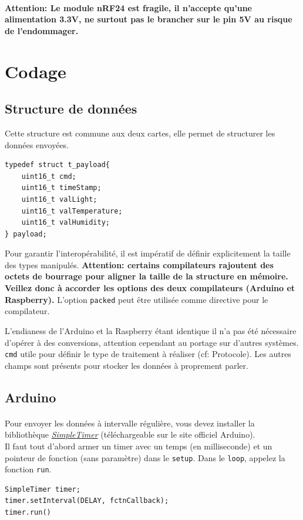 \documentclass[a4paper, titlepage, oneside, 12pt]{article}%
\begin{document}
\paragraph{}
\textbf{Attention: Le module nRF24 est fragile, il n'accepte qu'une alimentation 3.3V, ne surtout pas le brancher sur le pin 5V au risque de l'endommager.}

\section{Codage}
\subsection{Structure de données}
Cette structure est commune aux deux cartes, elle permet de structurer les données envoyées.
\begin{lstlisting}
typedef struct t_payload{
	uint16_t cmd;
	uint16_t timeStamp;
	uint16_t valLight;
	uint16_t valTemperature;
	uint16_t valHumidity;
} payload;
\end{lstlisting}
Pour garantir l’interopérabilité, il est impératif de définir explicitement la taille des types manipulés.
\textbf{Attention: certains compilateurs rajoutent des octets de bourrage pour aligner la taille de la structure en mémoire. Veillez donc à accorder les options des deux compilateurs (Arduino et Raspberry).}
L'option \texttt{packed} peut être utilisée comme directive pour le compilateur.
  
L'endianess de l'Arduino et la Raspberry étant identique il n'a pas été nécessaire d'opérer à des conversions, attention cependant au portage sur d'autres systèmes.
\texttt{cmd} utile pour définir le type de traitement à réaliser (cf: Protocole).
Les autres champs sont présents pour stocker les données à proprement parler.
\subsection{Arduino}
\paragraph{}
Pour envoyer les données à intervalle régulière, vous devez installer la bibliothèque \href{http://playground.arduino.cc/Code/SimpleTimer?ref=driverlayer.com/web}{\textit{SimpleTimer}} (téléchargeable sur le site officiel Arduino).\\
Il faut tout d'abord armer un timer avec un temps (en milliseconde) et un pointeur de fonction (sans paramètre) dans le \texttt{setup}. Dans le \texttt{loop}, appelez la fonction \texttt{run}.\\
\begin{lstlisting}
SimpleTimer timer;
timer.setInterval(DELAY, fctnCallback);
timer.run()
\end{lstlisting}
\end{document}
